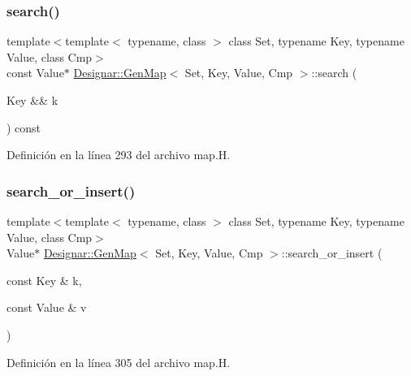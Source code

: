 \subsubsection{\texorpdfstring{search()}{search()}\hspace{0.1cm}{\footnotesize\ttfamily [4/4]}}
{\footnotesize\ttfamily template$<$template$<$ typename, class $>$ class Set, typename Key, typename Value, class Cmp$>$ \\
const Value$\ast$ \hyperlink{class_designar_1_1_gen_map}{Designar\+::\+Gen\+Map}$<$ Set, Key, Value, Cmp $>$\+::search (\begin{DoxyParamCaption}\item[{Key \&\&}]{k }\end{DoxyParamCaption}) const\hspace{0.3cm}{\ttfamily [inline]}}



Definición en la línea 293 del archivo map.\+H.

\mbox{\label{class_designar_1_1_gen_map_a204d7e2d2d8d97cec886e60f4d4d22ec}} 
\subsubsection{\texorpdfstring{search\+\_\+or\+\_\+insert()}{search\_or\_insert()}\hspace{0.1cm}{\footnotesize\ttfamily [1/6]}}
{\footnotesize\ttfamily template$<$template$<$ typename, class $>$ class Set, typename Key, typename Value, class Cmp$>$ \\
Value$\ast$ \hyperlink{class_designar_1_1_gen_map}{Designar\+::\+Gen\+Map}$<$ Set, Key, Value, Cmp $>$\+::search\+\_\+or\+\_\+insert (\begin{DoxyParamCaption}\item[{const Key \&}]{k,  }\item[{const Value \&}]{v }\end{DoxyParamCaption})\hspace{0.3cm}{\ttfamily [inline]}}



Definición en la línea 305 del archivo map.\+H.

\mbox{\label{class_designar_1_1_gen_map_a12c2b26187291c9553ff36e8c00bce4b}} 
